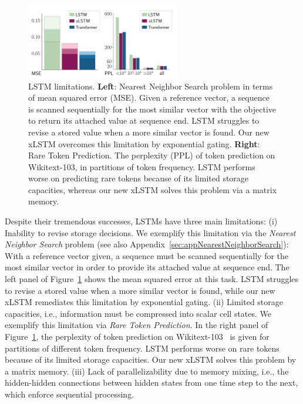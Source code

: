 \documentclass[dvipsnames]{article}
\begin{document}
\begin{figure}
 \vspace{-0.65cm}
    \includegraphics[angle=0,width=0.6\textwidth]{./figures/plot_lstm_deficiencies.pdf}
    \caption{LSTM limitations. 
      {\bf Left}: Nearest Neighbor Search problem in terms of 
      mean squared error (MSE).
      Given a reference vector, 
      a sequence is scanned sequentially
      for the most similar vector with the objective to return its attached value at sequence end. 
      LSTM struggles to revise a 
      stored value when a more similar vector is found. 
      Our new xLSTM overcomes this limitation by exponential gating. 
      {\bf Right}: Rare Token Prediction. The perplexity (PPL)
      of token prediction on Wikitext-103, 
      in partitions of token frequency. %
      LSTM performs worse on predicting rare tokens 
      because of its limited storage capacities, whereas
      our new xLSTM solves this  problem via a matrix memory.
      \label{fig:lstmProblems}}            
 \vspace{-0.3cm}
\end{figure}

Despite their tremendous successes, 
LSTMs have three main limitations:
(i) Inability to revise storage decisions.
We exemplify this limitation via the 
{\it Nearest Neighbor Search} problem 
(see also Appendix~\ref{sec:appNearestNeighborSearch}): 
With a reference vector given, 
a sequence must be scanned sequentially
for the most similar vector in order to provide 
its attached value at sequence end.  
The left panel of Figure~\ref{fig:lstmProblems} shows 
the mean squared error at this task.
LSTM struggles to revise a stored value when a more similar 
vector is found,
while our new xLSTM remediates this limitation by exponential gating.
(ii) Limited storage capacities, i.e., 
information must be compressed into scalar cell states.
We exemplify this limitation via {\it Rare Token Prediction}. 
In the right panel of Figure~\ref{fig:lstmProblems},
the perplexity of token prediction on Wikitext-103~\citep{Merity:17}
is given for partitions of different token frequency.  %
LSTM performs worse on rare tokens 
because of its limited storage capacities.
Our new xLSTM solves this problem by a matrix memory.
(iii) Lack of parallelizability due to memory mixing, i.e.,
the hidden-hidden connections between hidden states from one time step to the next,
which enforce sequential processing. 
\end{document}
